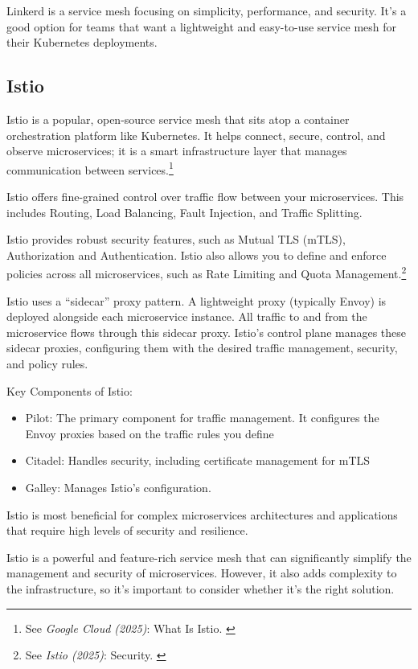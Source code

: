 Linkerd is a service mesh focusing on simplicity, performance, and
security. It's a good option for teams that want a lightweight and
easy-to-use service mesh for their Kubernetes deployments.

\subsection{Istio}

Istio is a popular, open-source service mesh that sits atop a container
orchestration platform like Kubernetes. It helps connect, secure,
control, and observe microservices; it is a smart infrastructure layer
that manages communication between services.\footnote{See \textit{Google Cloud (2025)}: What Is Istio. \cite{whatIsIstio}}

Istio offers fine-grained control over traffic flow between your
microservices. This includes Routing, Load Balancing, Fault Injection,
and Traffic Splitting.

Istio provides robust security features, such as Mutual TLS (mTLS),
Authorization and Authentication. Istio also allows you to define and
enforce policies across all microservices, such as Rate Limiting and
Quota Management.\footnote{See \textit{Istio (2025)}: Security. \cite{istioSecurity}}

Istio uses a ``sidecar'' proxy pattern. A lightweight proxy (typically
Envoy) is deployed alongside each microservice instance. All traffic to
and from the microservice flows through this sidecar proxy. Istio's
control plane manages these sidecar proxies, configuring them with the
desired traffic management, security, and policy rules.

Key Components of Istio:

\begin{itemize}
	\item Pilot: The primary component for traffic management. It configures the Envoy proxies based on the traffic rules you define
	\item Citadel: Handles security, including certificate management for mTLS
	\item Galley: Manages Istio's configuration.
\end{itemize}

Istio is most beneficial for complex microservices architectures and
applications that require high levels of security and resilience.

Istio is a powerful and feature-rich service mesh that can significantly
simplify the management and security of microservices. However, it also
adds complexity to the infrastructure, so it's important to consider
whether it's the right solution.

